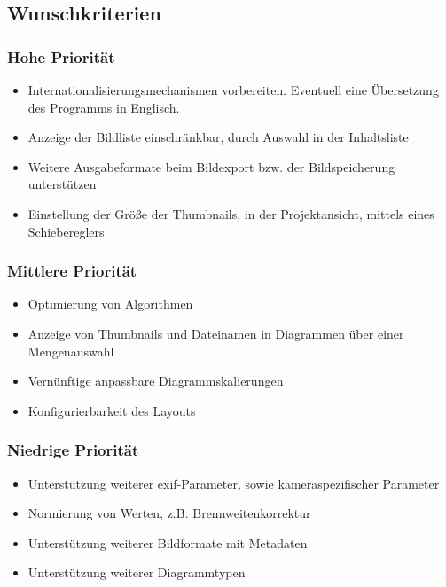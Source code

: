 \subsection{Wunschkriterien} 

\subsubsection{Hohe Priorität}

	\begin{itemize}
		\item Internationalisierungsmechanismen vorbereiten. Eventuell eine Übersetzung des Programms in Englisch.
		\item Anzeige der Bildliste einschränkbar, durch Auswahl in der Inhaltsliste
		\item Weitere Ausgabeformate beim Bildexport bzw. der Bildspeicherung unterstützen 
		\item Einstellung der Größe der Thumbnails, in der Projektansicht, mittels eines Schiebereglers
	\end{itemize}

\subsubsection{Mittlere Priorität}

	\begin{itemize}
		\item Optimierung von Algorithmen
		\item Anzeige von Thumbnails und Dateinamen in Diagrammen über einer Mengenauswahl
		\item Vernünftige anpassbare Diagrammskalierungen
		\item Konfigurierbarkeit des Layouts	
	\end{itemize}

\subsubsection{Niedrige Priorität}

	\begin{itemize}
		\item Unterstützung weiterer \gls{exif}-Parameter, sowie kameraspezifischer Parameter
		\item Normierung von Werten, z.B. Brennweitenkorrektur
		\item Unterstützung weiterer Bildformate mit Metadaten 	
		\item Unterstützung weiterer Diagrammtypen
	\end{itemize}

